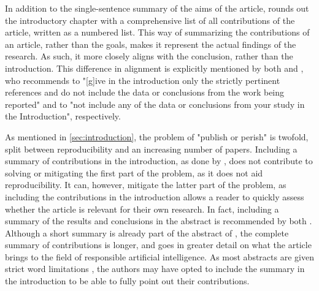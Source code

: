 In addition to the single-sentence summary of the aims of the article, \textcite{Barredo_2020} rounds out the introductory chapter with a comprehensive list of all contributions of the article, written as a numbered list. This way of summarizing the contributions of an article, rather than the goals, makes it represent the actual findings of the research. As such, it more closely aligns with the conclusion, rather than the introduction. This difference in alignment is explicitly mentioned by both \textcite[p.2]{Jha_2014} and \textcite[p.83]{Lin_2012}, who recommends to "[g]ive in the introduction only the strictly pertinent references and do not include the data or conclusions from the work being reported"  and to "not include any of the data or conclusions from your study in the Introduction", respectively.

As mentioned in \autoref{sec:introduction}, the problem of "publish or perish" is twofold, split between reproducibility and an increasing number of papers. Including a summary of contributions in the introduction, as done by \textcite{Barredo_2020}, does not contribute to solving or mitigating the first part of the problem, as it does not aid reproducibility. It can, however, mitigate the latter part of the problem, as including the contributions in the introduction allows a reader to quickly assess whether the article is relevant for their own research. In fact, including a summary of the results and conclusions in the abstract is recommended by both \textcites[p.2]{Jha_2014}[p.82]{Lin_2012}[p.114]{Cuschieri_2019}[p.359]{Davidson_2012}[p.115]{Katz_2006}[p.85]{Rosenfeldt_2000}. Although a short summary is already part of the abstract of \textcite[p.82]{Barredo_2020}, the complete summary of contributions is longer, and goes in greater detail on what the article brings to the field of responsible artificial intelligence. As most abstracts are given strict word limitations \parencite[p.85]{Rosenfeldt_2000}, the authors may have opted to include the summary in the introduction to be able to fully point out their contributions.

